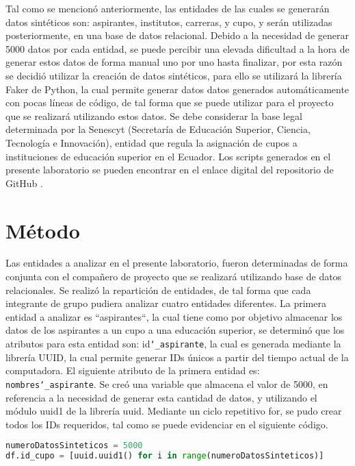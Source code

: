 \documentclass[10pt, oneside,spanish]{article}   	%
\begin{document}
Tal como se mencionó anteriormente, las entidades de las cuales se generarán datos sintéticos son: aspirantes, institutos, carreras, y cupo, y serán utilizadas posteriormente, en una base de datos relacional. Debido a la necesidad de generar 5000 datos por cada entidad, se puede percibir una elevada dificultad a la hora de generar estos datos de forma manual uno por uno hasta finalizar, por esta razón se decidió utilizar la creación de datos sintéticos, para ello se utilizará la librería Faker de Python, la cual permite generar datos datos generados automáticamente con pocas líneas de código, de tal forma que se puede utilizar para el proyecto que se realizará utilizando estos datos. Se debe considerar la base legal determinada por la Senescyt (Secretaría de Educación Superior, Ciencia, Tecnología e Innovación), entidad que regula la asignación de cupos a instituciones de educación superior en el Ecuador. Los scripts generados en el presente laboratorio se pueden encontrar en el enlace digital del repositorio de GitHub \cite{github}.

\section {Método}
Las entidades a analizar en el presente laboratorio, fueron determinadas de forma conjunta con el compañero de proyecto que se realizará utilizando base de datos relacionales. Se realizó la repartición de entidades, de tal forma que cada integrante de grupo pudiera analizar cuatro entidades diferentes. La primera entidad a analizar es ``aspirantes``, la cual tiene como por objetivo almacenar los datos de los aspirantes a un cupo a una educación superior, se determinó que los atributos para esta entidad son: id\texttt{\char`_aspirante}, la cual es generada mediante la librería UUID, la cual permite generar IDs únicos a partir del tiempo actual de la computadora.
El siguiente atributo de la primera entidad es: \texttt{nombres\char`_aspirante}. Se creó una variable que almacena el valor de 5000, en referencia a la necesidad de generar esta cantidad de datos, y utilizando el módulo uuid1 de la librería uuid. Mediante un ciclo repetitivo for, se pudo crear todos los IDs requeridos, tal como se puede evidenciar en el siguiente código.
\begin{lstlisting}[language=Python, caption=Python example,numbers=none,xleftmargin=.15in,xrightmargin=.15in]  
numeroDatosSinteticos = 5000
df.id_cupo = [uuid.uuid1() for i in range(numeroDatosSinteticos)]
\end{lstlisting}
\end{document}
